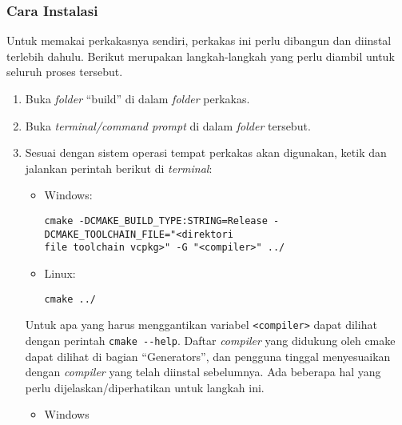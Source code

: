 \subsubsection{Cara Instalasi}
\label{sec:testing-implementation-installation-howto}

Untuk memakai perkakasnya sendiri, perkakas ini perlu dibangun dan diinstal terlebih dahulu. Berikut merupakan langkah-langkah yang perlu diambil untuk seluruh proses tersebut.

\begin{enumerate}
	\item Buka \textit{folder} ``build'' di dalam \textit{folder} perkakas.
	\item Buka \textit{terminal/command prompt} di dalam \textit{folder} tersebut.
	\item Sesuai dengan sistem operasi tempat perkakas akan digunakan, ketik dan jalankan perintah berikut di \textit{terminal}:
	
	\begin{itemize}
		\item Windows:
		\begin{verbatim}
cmake -DCMAKE_BUILD_TYPE:STRING=Release -DCMAKE_TOOLCHAIN_FILE="<direktori
file toolchain vcpkg>" -G "<compiler>" ../
		\end{verbatim}
	
		\item Linux:
		\begin{verbatim}
cmake ../
		\end{verbatim}
	\end{itemize}		

	Untuk apa yang harus menggantikan variabel \verb|<compiler>| dapat dilihat dengan perintah \verb|cmake --help|. Daftar \textit{compiler} yang didukung oleh cmake dapat dilihat di bagian \mbox{``Generators''}, dan pengguna tinggal menyesuaikan dengan \textit{compiler} yang telah diinstal sebelumnya.  Ada beberapa hal yang perlu dijelaskan/diperhatikan untuk langkah ini.
	
	\begin{itemize}
		\item Windows
			

\end{itemize}
\end{enumerate}
